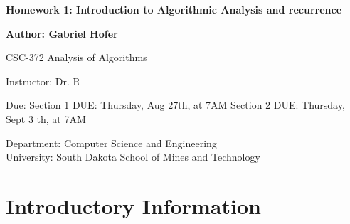 \documentclass[12pt]{article}
\begin{document}
\begin{titlepage}
   \begin{center}
       \vspace*{1cm}
       \large
       \textbf{Homework 1: Introduction to Algorithmic Analysis and recurrence}
       \normalsize

       \vspace{0.5cm}

       \textbf{Author: Gabriel Hofer}

       \vspace{0.5cm}

       CSC-372 Analysis of Algorithms

       \vspace{0.5cm}

       Instructor: Dr. R

       \vspace{0.5cm}

       Due:   
       Section 1 DUE: Thursday, Aug 27th, at 7AM  
       Section 2 DUE: Thursday, Sept 3 th, at 7AM  

       \vfill

       Department: Computer Science and Engineering\\
       University: South Dakota School of Mines and Technology\\

   \end{center}
\end{titlepage}
\newpage
\section{Introductory Information}
\end{document}
